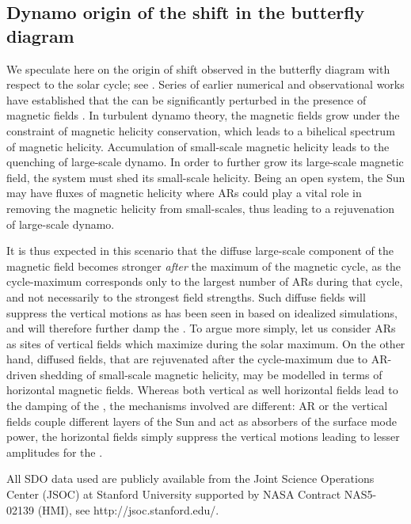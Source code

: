 \documentclass{aa}
\begin{document}
\subsection{Dynamo origin of the shift in the \fff butterfly diagram}
We speculate here on the origin of shift observed in the \fff butterfly diagram
with respect to the solar cycle; see .
Series of earlier numerical and observational works have established that the \fff can be
significantly perturbed in the presence of magnetic fields \citep{S+14,S+15,SRB16,S+20}.
In turbulent dynamo theory, the magnetic fields grow under the constraint of magnetic helicity
conservation, which leads to a bihelical spectrum of magnetic helicity. Accumulation of small-scale
magnetic helicity leads to the quenching of large-scale dynamo. In order to further grow its large-scale
magnetic field, the system must shed its small-scale helicity. Being an open system, the Sun
may have fluxes of magnetic helicity where ARs could play a vital role in removing the magnetic
helicity from small-scales, thus leading to a rejuvenation of large-scale dynamo.

It is thus expected in this scenario that the diffuse large-scale component of the magnetic field
becomes stronger \emph{after} the maximum of the magnetic cycle, as the cycle-maximum corresponds
only to the largest number of ARs during that cycle, and not necessarily to the strongest field
strengths. Such diffuse fields will suppress the vertical motions as has been seen in \citet{S+15}
based on idealized simulations, and will therefore further damp the \fff.
To argue more simply, let us consider ARs as sites of vertical fields which maximize during the
solar maximum. On the other hand, diffused fields, that are rejuvenated after the cycle-maximum due
to AR-driven shedding of small-scale magnetic helicity, may be modelled in terms of horizontal
magnetic fields. Whereas both vertical as well horizontal fields lead to the damping of the
\fff, the mechanisms involved are different: AR or the vertical fields couple different layers
of the Sun and act as absorbers of the surface mode power, the horizontal fields simply suppress the
vertical motions leading to lesser amplitudes for the \fff.

\begin{acknowledgements}
All SDO data used are publicly available from the Joint Science Operations Center (JSOC) at Stanford University supported by NASA Contract NAS5- 02139 (HMI), see http://jsoc.stanford.edu/. 
\end{acknowledgements}

{}

\end{document}
